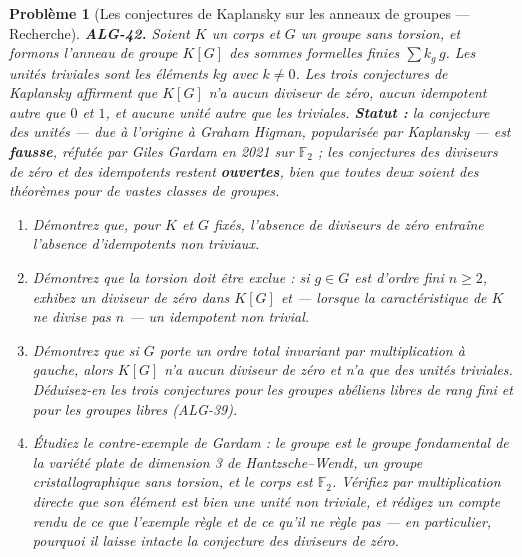 \documentclass[11pt]{article}
\newtheorem{problem}{Problème}
\begin{document}
\begin{problem}[{Les conjectures de Kaplansky sur les anneaux de groupes --- Recherche}]
\textbf{ALG-42.} Soient $K$ un corps et $G$ un groupe sans torsion, et formons l'anneau de groupe
$K[G]$ des sommes formelles finies $\sum k_g\, g$. Les unités \textit{triviales} sont les éléments
$k g$ avec $k \ne 0$. Les trois conjectures de Kaplansky affirment que $K[G]$ n'a aucun diviseur de
zéro, aucun idempotent autre que $0$ et $1$, et aucune unité autre que les triviales.
\textbf{Statut :} la conjecture des unités --- due à l'origine à Graham Higman, popularisée par Kaplansky --- est
\textbf{fausse}, réfutée par Giles Gardam en 2021 sur $\mathbb{F}_2$ ; les conjectures des diviseurs de zéro
et des idempotents restent \textbf{ouvertes}, bien que toutes deux soient des théorèmes pour de vastes classes
de groupes.
\begin{enumerate}
\item[(a)] Démontrez que, pour $K$ et $G$ fixés, l'absence de diviseurs de zéro entraîne l'absence
d'idempotents non triviaux.
\item[(b)] Démontrez que la torsion doit être exclue : si $g \in G$ est d'ordre fini $n \ge 2$, exhibez un
diviseur de zéro dans $K[G]$ et --- lorsque la caractéristique de $K$ ne divise pas $n$ --- un
idempotent non trivial.
\item[(c)] Démontrez que si $G$ porte un ordre total invariant par multiplication à gauche, alors $K[G]$
n'a aucun diviseur de zéro et n'a que des unités triviales. Déduisez-en les trois conjectures pour les
groupes abéliens libres de rang fini et pour les groupes libres (ALG-39).
\item[(d)] Étudiez le contre-exemple de Gardam : le groupe est le groupe fondamental de la variété plate de
dimension 3 de Hantzsche--Wendt, un groupe cristallographique sans torsion, et le corps est $\mathbb{F}_2$.
Vérifiez par multiplication directe que son élément est bien une unité non triviale, et rédigez un compte
rendu de ce que l'exemple règle et de ce qu'il ne règle pas --- en particulier, pourquoi il laisse intacte la
conjecture des diviseurs de zéro.
\end{enumerate}

\end{problem}
\end{document}

